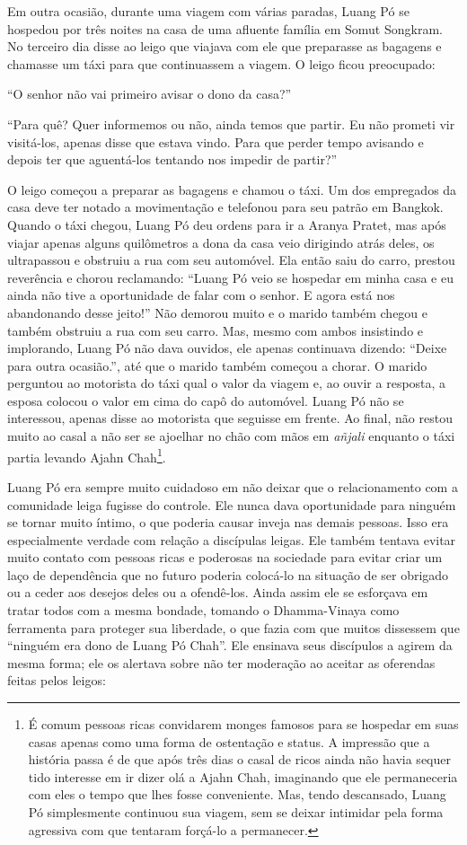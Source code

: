 Em outra ocasião, durante uma viagem com várias paradas, Luang Pó se
hospedou por três noites na casa de uma afluente família em Somut
Songkram. No terceiro dia disse ao leigo que viajava com ele que
preparasse as bagagens e chamasse um táxi para que continuassem a
viagem. O leigo ficou preocupado:

``O senhor não vai primeiro avisar o dono da casa?''

``Para quê? Quer informemos ou não, ainda temos que partir. Eu não
prometi vir visitá-los, apenas disse que estava vindo. Para que perder
tempo avisando e depois ter que aguentá-los tentando nos impedir de
partir?''

O leigo começou a preparar as bagagens e chamou o táxi. Um dos
empregados da casa deve ter notado a movimentação e telefonou para seu
patrão em Bangkok. Quando o táxi chegou, Luang Pó deu ordens para ir a
Aranya Pratet, mas após viajar apenas alguns quilômetros a dona da casa
veio dirigindo atrás deles, os ultrapassou e obstruiu a rua com seu
automóvel. Ela então saiu do carro, prestou reverência e chorou
reclamando: ``Luang Pó veio se hospedar em minha casa e eu ainda não
tive a oportunidade de falar com o senhor. E agora está nos abandonando
desse jeito!'' Não demorou muito e o marido também chegou e também
obstruiu a rua com seu carro. Mas, mesmo com ambos insistindo e
implorando, Luang Pó não dava ouvidos, ele apenas continuava dizendo:
``Deixe para outra ocasião.'', até que o marido também começou a chorar.
O marido perguntou ao motorista do táxi qual o valor da viagem e, ao
ouvir a resposta, a esposa colocou o valor em cima do capô do automóvel.
Luang Pó não se interessou, apenas disse ao motorista que seguisse em
frente. Ao final, não restou muito ao casal a não ser se ajoelhar no
chão com mãos em \emph{añjali} enquanto o táxi partia levando Ajahn
Chah\footnote{É comum pessoas ricas convidarem monges famosos para se
  hospedar em suas casas apenas como uma forma de ostentação e status. A
  impressão que a história passa é de que após três dias o casal de
  ricos ainda não havia sequer tido interesse em ir dizer olá a Ajahn
  Chah, imaginando que ele permaneceria com eles o tempo que lhes fosse
  conveniente. Mas, tendo descansado, Luang Pó simplesmente continuou
  sua viagem, sem se deixar intimidar pela forma agressiva com que
  tentaram forçá-lo a permanecer.}.

Luang Pó era sempre muito cuidadoso em não deixar que o relacionamento
com a comunidade leiga fugisse do controle. Ele nunca dava oportunidade
para ninguém se tornar muito íntimo, o que poderia causar inveja nas
demais pessoas. Isso era especialmente verdade com relação a discípulas
leigas. Ele também tentava evitar muito contato com pessoas ricas e
poderosas na sociedade para evitar criar um laço de dependência que no
futuro poderia colocá-lo na situação de ser obrigado ou a ceder aos
desejos deles ou a ofendê-los. Ainda assim ele se esforçava em tratar
todos com a mesma bondade, tomando o Dhamma-Vinaya como ferramenta para
proteger sua liberdade, o que fazia com que muitos dissessem que
``ninguém era dono de Luang Pó Chah''. Ele ensinava seus discípulos a
agirem da mesma forma; ele os alertava sobre não ter moderação ao
aceitar as oferendas feitas pelos leigos:


